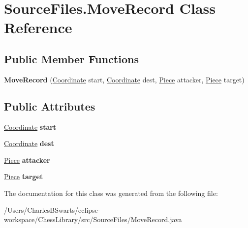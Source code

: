 \hypertarget{class_source_files_1_1_move_record}{}\section{Source\+Files.\+Move\+Record Class Reference}
\label{class_source_files_1_1_move_record}
\subsection*{Public Member Functions}
\begin{DoxyCompactItemize}
\item 
\mbox{\label{class_source_files_1_1_move_record_a6ea76c8157cf0071099c13b779d153a3}} 
{\bfseries Move\+Record} (\mbox{\hyperlink{class_source_files_1_1_coordinate}{Coordinate}} start, \mbox{\hyperlink{class_source_files_1_1_coordinate}{Coordinate}} dest, \mbox{\hyperlink{class_source_files_1_1_piece}{Piece}} attacker, \mbox{\hyperlink{class_source_files_1_1_piece}{Piece}} target)
\end{DoxyCompactItemize}
\subsection*{Public Attributes}
\begin{DoxyCompactItemize}
\item 
\mbox{\label{class_source_files_1_1_move_record_ac7071333089312aa1034c69cde5310bb}} 
\mbox{\hyperlink{class_source_files_1_1_coordinate}{Coordinate}} {\bfseries start}
\item 
\mbox{\label{class_source_files_1_1_move_record_a3b78c14d9053b0c8dc65d06503da3767}} 
\mbox{\hyperlink{class_source_files_1_1_coordinate}{Coordinate}} {\bfseries dest}
\item 
\mbox{\label{class_source_files_1_1_move_record_a969b8ed3bcaa2524fb2a9458d6771b24}} 
\mbox{\hyperlink{class_source_files_1_1_piece}{Piece}} {\bfseries attacker}
\item 
\mbox{\label{class_source_files_1_1_move_record_af390bf9e25008e5d301fa0ddf04a37ed}} 
\mbox{\hyperlink{class_source_files_1_1_piece}{Piece}} {\bfseries target}
\end{DoxyCompactItemize}


The documentation for this class was generated from the following file\+:\begin{DoxyCompactItemize}
\item 
/\+Users/\+Charles\+B\+Swarts/eclipse-\/workspace/\+Chess\+Library/src/\+Source\+Files/Move\+Record.\+java\end{DoxyCompactItemize}
